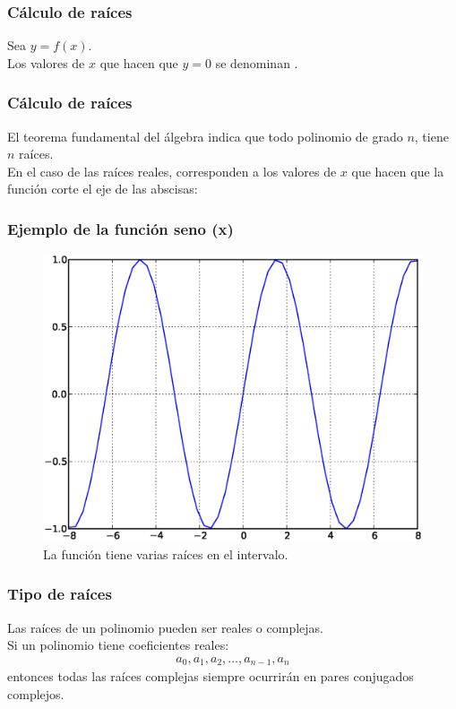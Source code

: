\documentclass[12pt]{beamer}
\begin{document}
\begin{frame}
\frametitle{Cálculo de raíces}
Sea $y = f (x)$.  
\\
\bigskip
Los valores de $x$ que hacen que $y = 0$ se denominan .
\end{frame}
\begin{frame}
\frametitle{Cálculo de raíces}
El teorema fundamental del álgebra indica que todo polinomio de grado $n$, tiene $n$ raíces.
\\
\bigskip
\pause
En el caso de las raíces reales, corresponden a los valores de $x$ que hacen que la función corte el eje de las abscisas:
\end{frame}
\begin{frame}
\frametitle{Ejemplo de la función seno (x)}
\begin{figure}
	\centering
	\includegraphics[scale=0.4]{Imagenes/raices00.eps}
	\caption{La función tiene varias raíces en el intervalo.} 
\end{figure}
\end{frame}
\begin{frame}
\frametitle{Tipo de raíces}
Las raíces de un polinomio pueden ser reales o complejas.
\\
\bigskip
\pause
Si un polinomio tiene coeficientes reales:
\begin{align*}
a_{0}, a_{1}, a_{2}, \ldots, a_{n-1}, a_{n}
\end{align*}
entonces todas las raíces complejas siempre ocurrirán en pares conjugados complejos.
\end{frame}
\end{document}
